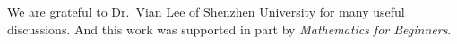 We are grateful to Dr.\ Vian Lee of Shenzhen University for many useful discussions. And this work was supported in part by \emph{Mathematics for Beginners}.
